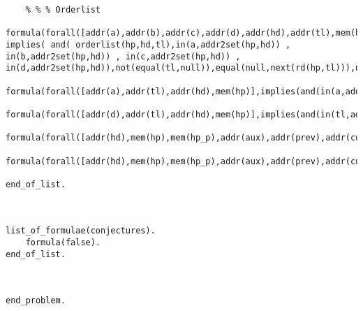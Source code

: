 \begin{lstlisting}
    % % % Orderlist
    formula(forall([addr(a),addr(b),addr(c),addr(d),addr(hd),addr(tl),mem(hp)], implies( and( orderlist(hp,hd,tl),in(a,addr2set(hp,hd)) , in(b,addr2set(hp,hd)) , in(c,addr2set(hp,hd)) , in(d,addr2set(hp,hd)),not(equal(tl,null)),equal(null,next(rd(hp,tl))),not(equal(c,null)),not(equal(d,null)),not(equal(a,null)),not(equal(b,null)),not(equal(a,tl)),not(equal(b,tl)),equal(next(rd(hp,c)),a),equal(next(rd(hp,d)),b)),implies(equal(a,b),equal(c,d)))),next_injective__if_ordered).
    formula(forall([addr(a),addr(tl),addr(hd),mem(hp)],implies(and(in(a,addr2set(hp,hd)),in(tl,addr2set(hp,hd)),not(equal(hd,null)),not(equal(tl,null)),not(equal(a,null)),equal(next(rd(hp,tl)),null)),not(equal(next(rd(hp,a)),a)))),next_is_not_same__if_ordered).
    formula(forall([addr(d),addr(tl),addr(hd),mem(hp)],implies(and(in(tl,addr2set(hp,hd)),not(equal(hd,null)),not(equal(tl,null)),equal(next(rd(hp,tl)),null),not(equal(d,null)),equal(next(rd(hp,d)),null),in(d,addr2set(hp,hd))),equal(d,tl))),just_tail__points__null).
    formula(forall([addr(hd),mem(hp),mem(hp_p),addr(aux),addr(prev),addr(curr),addr(tl)],implies(and(orderlist(hp,hd,tl),not(equal(tl,null)),equal(next(rd(hp,tl)),null),ls_elem(data(rd(hp,prev)),data(rd(hp,aux))),ls_elem(data(rd(hp,aux)),data(rd(hp,curr))),equal(next(rd(hp,aux)),curr),equal(next(rd(hp,prev)),curr),equal(hp_p,upd(hp,prev,mkcell(data(rd(hp,prev)),aux,lockid(rd(hp,prev)))))),orderlist(hp_p,hd,tl))),insert__keeps_orderlist).
    formula(forall([addr(hd),mem(hp),mem(hp_p),addr(aux),addr(prev),addr(curr),addr(tl)],implies(and(equal(aux,next(rd(hp,curr))),equal(curr,next(rd(hp,prev))),not(equal(aux,null)),equal(null,next(rd(hp,tl))),not(equal(aux,next(rd(hp,prev)))),equal(hp_p,upd(hp,prev,mkcell(data(rd(hp,prev)),aux,lockid(rd(hp,prev))))),in(prev,addr2set(hp,hd)),in(curr,addr2set(hp,hd)),in(null,addr2set(hp,hd)),in(aux,addr2set(hp,hd)),orderlist(hp,hd,tl)),orderlist(hp_p,hd,tl))),remove__keeps_orderlist).

end_of_list.



list_of_formulae(conjectures).
    formula(false).
end_of_list.



end_problem.



\end{lstlisting}